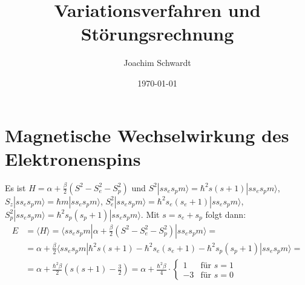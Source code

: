 \documentclass[a4paper,12pt]{article}
\newcommand{\bra}{}
\newcommand{\braket}{}
\newcommand{\kla}{}
\newcommand{\tecxt}{}
\newcommand{\Ket}{}
\begin{document}
\title{Variationsverfahren und Störungsrechnung}
\author{Joachim Schwardt}
\date{\today}
\maketitle

\section{Magnetische Wechselwirkung des Elektronenspins}
Es ist $H=\alpha + \frac{\beta}{2}\kla\left( {S^2-S_e^2-S_p^2} \right)$ und $S^2\Ket | {ss_es_pm} \rangle=\hbar^2s(s+1)\Ket | {ss_es_pm} \rangle$, $S_z\Ket | {ss_es_pm} \rangle=\hbar m\Ket | {ss_es_pm} \rangle$, $S_e^2\Ket | {ss_es_pm} \rangle=\hbar^2s_e(s_e+1)\Ket | {ss_es_pm} \rangle$, $S_p^2\Ket | {ss_es_pm} \rangle=\hbar^2s_p(s_p+1)\Ket | {ss_es_pm} \rangle$. Mit $s=s_e+s_p$ folgt dann:
\begin{align*}
E&=\bra\langle {H}\rangle=\braket\langle {ss_es_pm} | {\alpha + \frac{\beta}{2}\kla\left( {S^2-S_e^2-S_p^2} \right)} | {ss_es_pm}\rangle= \\
&=\alpha+\frac{\beta}{2}\braket\langle {ss_es_pm} | {\hbar^2s(s+1)-\hbar^2s_e(s_e+1)-\hbar^2s_p(s_p+1)} | {ss_es_pm}\rangle= \\
&=\alpha+\frac{\hbar^2\beta}{2}\kla\left( {s(s+1)-\frac{3}{2}} \right)=\alpha + \frac{\hbar^2\beta}{4}\cdot\left\{\begin{matrix}
1 & \tecxt\text{für }s=1 \\
-3 & \tecxt\text{für }s=0 
\end{matrix}\right.
\end{align*}
\end{document}

